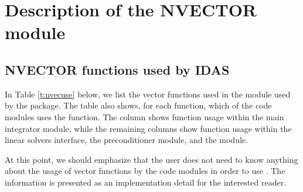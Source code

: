 \chapter{Description of the NVECTOR module}\label{s:nvector}



\section{NVECTOR functions used by IDAS}

In Table \ref{t:nvecuse} below, we list the vector functions used in the 
{\nvector} module used by the {\idas} package.
The table also shows, for each function, which of the code modules uses
the function. The {\idas} column shows function usage within the main
integrator module, while the remaining columns show function usage
within the {\idas} linear solvers interface, the {\idabbdpre}
preconditioner module, and the {\idaa} module.

At this point, we should emphasize that the {\idas} user does not need to know 
anything about the usage of vector functions by the {\idas} code modules in order 
to use {\idas}. The information is presented as an implementation detail for the 
interested reader.

